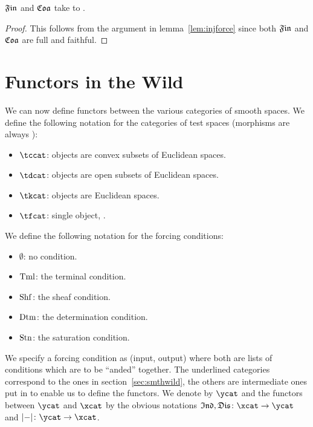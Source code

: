\documentclass[%
a4paper,%
arxiv,%
defaults
]{myclass}
\begin{document}
\begin{proposition}
\(\finfunc\) and \(\coafunc\) take \BuFVtobjs to \AuFVtobjs.
\end{proposition}

\begin{proof}
This follows from the argument in lemma~\ref{lem:injforce} since both \(\finfunc\) and \(\coafunc\) are full and faithful.
\end{proof}


\section{Functors in the Wild}
\label{sec:funwild}

We can now define functors between the various categories of smooth spaces.
We define the following notation for the categories of test spaces (morphisms are always \cimaps):
%
\begin{itemize}
\item \(\tccat\): objects are convex subsets of Euclidean spaces.
\item \(\tdcat\): objects are open subsets of Euclidean spaces.
\item \(\tkcat\): objects are Euclidean spaces.
\item \(\tfcat\): single object, \R.
\end{itemize}

We define the following notation for the forcing conditions:
%
\begin{itemize}
\item \(\emptyset\): no condition.
\item \(\operatorname{Tml}\): the terminal condition.
\item \(\operatorname{Shf}\): the sheaf condition.
\item \(\operatorname{Dtm}\): the determination condition.
\item \(\operatorname{Stn}\): the saturation condition.
\end{itemize}
%
We specify a forcing condition as (input, output) where both are lists of conditions which are to be ``anded'' together.
The underlined categories correspond to the ones in section~\ref{sec:smthwild}, the others are intermediate ones put in to enable us to define the functors.
We denote \ycat by \(\ycat\) and the functors between \(\ycat\) and \(\xcat\) by the obvious notations \(\indfunc, \disfunc \colon \xcat \to \ycat\) and \(\forfunc \colon \ycat \to \xcat\).
\end{document}
